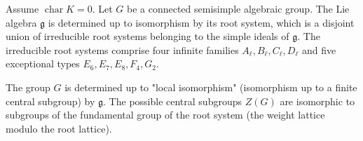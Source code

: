 Assume $\operatorname{char} K = 0$. Let $G$ be a connected semisimple algebraic group. The Lie algebra $\mathfrak{g}$ is determined up to isomorphism by its root system, which is a disjoint union of irreducible root systems belonging to the simple ideals of $\mathfrak{g}$. The irreducible root systems comprise four infinite families $A_\ell, B_\ell, C_\ell, D_\ell$ and five exceptional types $E_6, E_7, E_8, F_4, G_2$.

The group $G$ is determined up to "local isomorphism" (isomorphism up to a finite central subgroup) by $\mathfrak{g}$. The possible central subgroups $Z(G)$ are isomorphic to subgroups of the fundamental group of the root system (the weight lattice modulo the root lattice).
